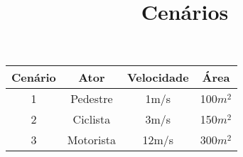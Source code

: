 \documentclass[a4paper,10pt]{article}
\title{Cenários}
\author{}
\date{}
\begin{document}
\begin{center}
  \begin{tabular}{cccc}
    \hline
      Cenário & Ator  & Velocidade & Área \\ 
    \hline
    1  & Pedestre   & 1m/s   & 100$m^{2}$\\
    2  & Ciclista   & 3m/s   & 150$m^{2}$\\
    3  & Motorista  & 12m/s  & 300$m^{2}$\\
    \hline
  \end{tabular}
\end{center}
\end{document}
